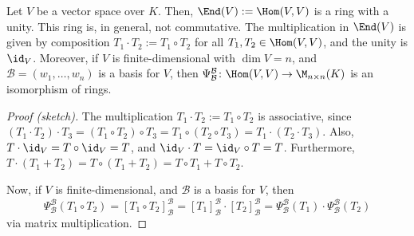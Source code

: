 \begin{corollary}
  Let $V$ be a vector space over $K$. Then, $\End(V) := \Hom(V,V)$ is a ring with a unity. This ring is, in general, not commutative. The multiplication in $\End(V)$ is given by composition $T_1 \cdot T_2 := T_1 \circ T_2$ for all $T_1, T_2 \in \Hom(V,V)$, and the unity is $\id_V$. Moreover, if $V$ is finite-dimensional with $\dim V = n$, and $\mathcal{B} = (w_1, \dots, w_n)$ is a basis for $V$, then $\Psi_{\mathcal{B}}^{\mathcal{B}} \colon \Hom(V,V) \to \M_{n \times n}(K)$ is an isomorphism of rings.
\end{corollary}

\begin{proof}[Proof (sketch)]
  The multiplication $T_1 \cdot T_2 := T_1 \circ T_2$ is associative, since $(T_1 \cdot T_2) \cdot T_3 = (T_1 \circ T_2) \circ T_3 = T_1 \circ (T_2 \circ T_3) = T_1 \cdot (T_2 \cdot T_3)$. Also, $T \cdot \id_V = T \circ \id_V = T$, and $\id_V \cdot T = \id_V \circ T = T$. Furthermore, $T \cdot (T_1 + T_2) = T \circ (T_1 + T_2) = T \circ T_1 + T \circ T_2$.

  Now, if $V$ is finite-dimensional, and $\mathcal{B}$ is a basis for $V$, then
  $$\Psi_{\mathcal{B}}^{\mathcal{B}}(T_1 \circ T_2) = [T_1 \circ T_2]_{\mathcal{B}}^{\mathcal{B}} = [T_1]_{\mathcal{B}}^{\mathcal{B}} \cdot [T_2]_{\mathcal{B}}^{\mathcal{B}} = \Psi_{\mathcal{B}}^{\mathcal{B}}(T_1) \cdot \Psi_{\mathcal{B}}^{\mathcal{B}}(T_2)$$
  via matrix multiplication.
\end{proof}
